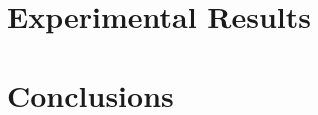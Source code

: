 \documentclass{sig-alternate}
\begin{document}






\section{Experimental Results}
\label{sec:res}



\section{Conclusions}
\label{sec:concl}





% 
\end{document}
